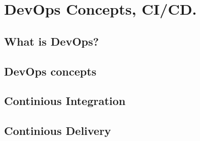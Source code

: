 \chapter{DevOps Concepts, CI/CD.}

\section{What is DevOps?}

\section{DevOps concepts}

\section{Continious Integration}

\section{Continious Delivery}